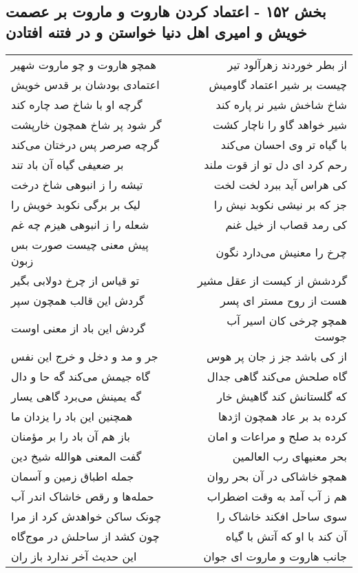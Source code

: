 \begin{center}
\section*{بخش ۱۵۲ - اعتماد کردن هاروت و ماروت بر عصمت خویش و امیری اهل دنیا خواستن و در فتنه افتادن}
\label{sec:sh152}
\begin{longtable}{l p{0.5cm} r}
همچو هاروت و چو ماروت شهیر
&&
از بطر خوردند زهرآلود تیر
\\
اعتمادی بودشان بر قدس خویش
&&
چیست بر شیر اعتماد گاومیش
\\
گرچه او با شاخ صد چاره کند
&&
شاخ شاخش شیر نر پاره کند
\\
گر شود پر شاخ همچون خارپشت
&&
شیر خواهد گاو را ناچار کشت
\\
گرچه صرصر پس درختان می‌کند
&&
با گیاه تر وی احسان می‌کند
\\
بر ضعیفی گیاه آن باد تند
&&
رحم کرد ای دل تو از قوت ملند
\\
تیشه را ز انبوهی شاخ درخت
&&
کی هراس آید ببرد لخت لخت
\\
لیک بر برگی نکوبد خویش را
&&
جز که بر نیشی نکوبد نیش را
\\
شعله را ز انبوهی هیزم چه غم
&&
کی رمد قصاب از خیل غنم
\\
پیش معنی چیست صورت بس زبون
&&
چرخ را معنیش می‌دارد نگون
\\
تو قیاس از چرخ دولابی بگیر
&&
گردشش از کیست از عقل مشیر
\\
گردش این قالب همچون سپر
&&
هست از روح مستر ای پسر
\\
گردش این باد از معنی اوست
&&
همچو چرخی کان اسیر آب جوست
\\
جر و مد و دخل و خرج این نفس
&&
از کی باشد جز ز جان پر هوس
\\
گاه جیمش می‌کند گه حا و دال
&&
گاه صلحش می‌کند گاهی جدال
\\
گه یمینش می‌برد گاهی یسار
&&
که گلستانش کند گاهیش خار
\\
همچنین این باد را یزدان ما
&&
کرده بد بر عاد همچون اژدها
\\
باز هم آن باد را بر مؤمنان
&&
کرده بد صلح و مراعات و امان
\\
گفت المعنی هوالله شیخ دین
&&
بحر معنیهای رب العالمین
\\
جمله اطباق زمین و آسمان
&&
همچو خاشاکی در آن بحر روان
\\
حمله‌ها و رقص خاشاک اندر آب
&&
هم ز آب آمد به وقت اضطراب
\\
چونک ساکن خواهدش کرد از مرا
&&
سوی ساحل افکند خاشاک را
\\
چون کشد از ساحلش در موج‌گاه
&&
آن کند با او که آتش با گیاه
\\
این حدیث آخر ندارد باز ران
&&
جانب هاروت و ماروت ای جوان
\\
\end{longtable}
\end{center}
